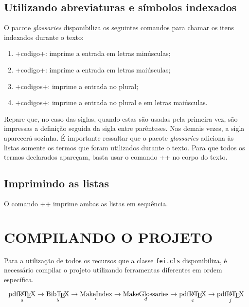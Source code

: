 \documentclass[xindy,rascunho]{fei}
\begin{document}
\begin{teorema}
	\section{Utilizando abreviaturas e símbolos indexados}
	
	O pacote \emph{glossaries} disponibiliza os seguintes comandos para chamar os itens indexados durante o texto:
	
	\begin{enumerate}
	\item \latexinline+\gls{codigo}+: imprime a entrada em letras minúsculas;
	\item \latexinline+\Gls{codigo}+: imprime a entrada em letras maiúsculas;
	\item \latexinline+\glspl{codigo}+: imprime a entrada no plural;
	\item \latexinline+\Glspl{codigo}+: imprime a entrada no plural e em letras maiúsculas.
	\end{enumerate}
	
	Repare que, no caso das siglas, quando estas são usadas pela primeira vez, são impressas a definição seguida da sigla entre parênteses. Nas demais vezes, a sigla aparecerá sozinha. É importante ressaltar que o pacote \emph{glossaries} adiciona às listas somente os termos que foram utilizados durante o texto. Para que todos os termos declarados apareçam, basta usar o comando \latexinline+\glsaddall+ no corpo do texto.
	
	\section{Imprimindo as listas}
	
	O comando \latexinline+\printglossaries+ imprime ambas as listas em sequência.

	\chapter{COMPILANDO O PROJETO} \label{chap:compilando}
	
	Para a utilização de todos os recursos que a classe \texttt{fei.cls} disponibiliza, é necessário compilar o projeto utilizando ferramentas diferentes em ordem específica.
	
	\[\operatorname*{\text{pdf\LaTeX}}_a \to \operatorname*{\text{Bib\TeX}}_b \to \operatorname*{\text{MakeIndex}}_c \to \operatorname*{\text{MakeGlossaries}}_d \to \operatorname*{\text{pdf\LaTeX}}_e \to \operatorname*{\text{pdf\LaTeX}}_f\]
	

\end{teorema}
\end{document}
